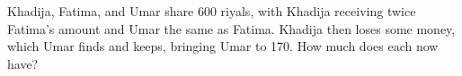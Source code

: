 Khadija, Fatima, and Umar share 600 riyals, with Khadija receiving twice Fatima's amount and Umar the same as Fatima. Khadija then loses some money, which Umar finds and keeps, bringing Umar to 170. How much does each now have?
